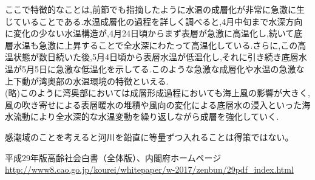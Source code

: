 \documentclass[12pt,a4paper]{jarticle}
\begin{document}
ここで特徴的なことは,前節でも指摘したように水温の成層化が非常に急激に生じていることである.水温成層化の過程を詳しく調べると,4月中旬まで水深方向に変化の少ない水温構造が,4月24日頃からまず表層が急激に高温化し,続いて底層水温も急激に上昇することで全水深にわたって高温化している.さらに,この高温状態が数日続いた後,5月4日頃から表層水温が低温化し,それに引き続き底層水温が5月5日に急激な低温化を示してる.このような急激な成層化や水温の急激な上下動が湾奥部の水温環境の特徴といえる.\\
(略)このように湾奥部においては成層形成過程においても海上風の影響が大きく,風の吹き寄せによる表層暖水の堆積や風向の変化による底層水の浸入といった海水流動により全水深的な水温変動を繰り返しながら成層を強化していく.

感潮域のことを考えると河川を鉛直に等量ずつ入れることは得策ではない。




\begin{thebibliography}{99}

平成29年版高齢社会白書（全体版）、内閣府ホームページ\url{http://www8.cao.go.jp/kourei/whitepaper/w-2017/zenbun/29pdf_index.html}

\end{thebibliography}
\end{document}
